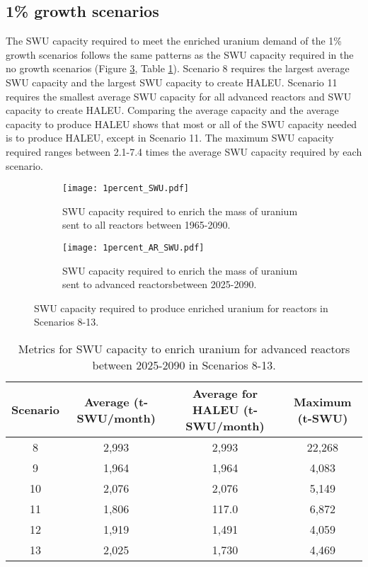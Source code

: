 \subsection{1\% growth scenarios}
The \gls{SWU} capacity required to meet the enriched uranium demand of 
the 1\% growth scenarios 
follows the same patterns as the \gls{SWU} capacity required in the no 
growth scenarios (Figure \ref{fig:1percent_swu}, Table \ref{tab:1percent_swu}).
Scenario 8 requires the largest average \gls{SWU} 
capacity and the largest \gls{SWU} capacity to create \gls{HALEU}. 
Scenario 11 requires the smallest average \gls{SWU} capacity for all 
advanced reactors and \gls{SWU} capacity to create \gls{HALEU}. Comparing 
the average capacity and the average capacity to produce \gls{HALEU} 
shows that most or all of the \gls{SWU} capacity needed is to produce 
\gls{HALEU}, except in Scenario 11. The 
maximum \gls{SWU} capacity required ranges between 2.1-7.4 times 
the average \gls{SWU} capacity required by each scenario. 

\begin{figure}
    \centering
    \begin{subfigure}[b]{0.45\textwidth}
        \centering
        \texttt{[image: 1percent\_SWU.pdf]}
        \caption{\gls{SWU} capacity required to enrich the mass of 
        uranium sent to all reactors between 1965-2090.}
        \label{fig:1percent_all_SWU}
    \end{subfigure}
    \hfill
    \begin{subfigure}[b]{0.45\textwidth}
        \centering
        \texttt{[image: 1percent\_AR\_SWU.pdf]}
        \caption{\gls{SWU} capacity required to enrich the mass of 
        uranium sent to advanced reactorsbetween 2025-2090.}
        \label{fig:1percent_AR_SWU}
    \end{subfigure}
       \caption{\gls{SWU} capacity required to produce enriched uranium 
       for reactors in Scenarios 8-13.}
       \label{fig:1percent_swu}
\end{figure}

\begin{table}
    \centering 
    \caption{Metrics for \gls{SWU} capacity to enrich uranium for 
    advanced reactors between 2025-2090 in Scenarios 8-13.}
    \label{tab:1percent_swu}
    \begin{tabular}{c c c c}
        \hline
        Scenario & Average (t-SWU/month) & Average  
        for \gls{HALEU} (t-SWU/month) & Maximum (t-SWU)\\\hline
        8 & 2,993 & 2,993 & 22,268 \\
        9 & 1,964 & 1,964 & 4,083 \\
        10 & 2,076 & 2,076 & 5,149\\
        11 & 1,806 & 117.0 & 6,872 \\
        12 & 1,919 & 1,491 & 4,059\\
        13 & 2,025 & 1,730 & 4,469\\
        \hline
    \end{tabular}
\end{table}

